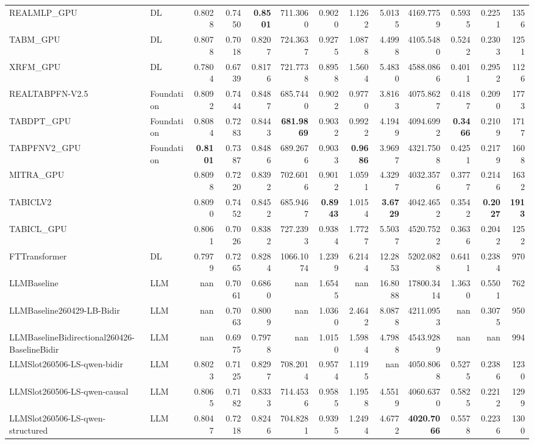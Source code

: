 \begin{table}[htbp]
{\begin{tabular}{ll|rrrrrrrrrr|r}
REALMLP\_GPU & DL & 0.8028 & 0.7450 & \textbf{0.8501} & 711.3060 & 0.9020 & 1.1262 & 5.0135 & 4169.7759 & 0.5935 & 0.2251 & 1356 \\
TABM\_GPU & DL & 0.8078 & 0.7018 & 0.8207 & 724.3637 & 0.9275 & 1.0878 & 4.4998 & 4105.5480 & 0.5242 & 0.2303 & 1251 \\
XRFM\_GPU & DL & 0.7804 & 0.6739 & 0.8176 & 721.7738 & 0.8958 & 1.5604 & 5.4830 & 4588.0866 & 0.4011 & 0.2952 & 1126 \\
REALTABPFN-V2.5 & Foundation & 0.8092 & 0.7444 & 0.8487 & 685.7440 & 0.9022 & 0.9770 & 3.8163 & 4075.8627 & 0.4187 & 0.2090 & 1773 \\
TABDPT\_GPU & Foundation & 0.8084 & 0.7283 & 0.8443 & \textbf{681.9869} & 0.9032 & 0.9922 & 4.1949 & 4094.6992 & \textbf{0.3466} & 0.2109 & 1717 \\
TABPFNV2\_GPU & Foundation & \textbf{0.8101} & 0.7387 & 0.8486 & 689.2676 & 0.9033 & \textbf{0.9686} & 3.9697 & 4321.7508 & 0.4251 & 0.2179 & 1608 \\
MITRA\_GPU &  & 0.8098 & 0.7220 & 0.8392 & 702.6016 & 0.9012 & 1.0591 & 4.3297 & 4032.3576 & 0.3777 & 0.2146 & 1632 \\
TABICLV2 &  & 0.8090 & 0.7452 & 0.8452 & 685.9467 & \textbf{0.8943} & 1.0154 & \textbf{3.6729} & 4042.4652 & 0.3542 & \textbf{0.2027} & \textbf{1913} \\
TABICL\_GPU &  & 0.8061 & 0.7026 & 0.8382 & 727.2393 & 0.9384 & 1.7727 & 5.5037 & 4520.7522 & 0.3636 & 0.2042 & 1252 \\
\midrule
FTTransformer & DL & 0.7979 & 0.7265 & 0.8284 & 1066.1074 & 1.2399 & 6.2144 & 12.2853 & 5202.0828 & 0.6411 & 0.2384 & 970 \\
LLMBaseline & LLM & nan & 0.7061 & 0.6860 & nan & 1.6545 & nan & 16.8088 & 17800.3414 & 1.3630 & 0.5501 & 762 \\
LLMBaseline260429-LB-Bidir & LLM & nan & 0.7063 & 0.8009 & nan & 1.0360 & 2.4642 & 8.0878 & 4211.0953 & nan & 0.3075 & 950 \\
LLMBaselineBidirectional260426-BaselineBidir & LLM & nan & 0.6975 & 0.7978 & nan & 1.0150 & 1.5984 & 4.7988 & 4543.9289 & nan & nan & 994 \\
LLMSlot260506-LS-qwen-bidir & LLM & 0.8023 & 0.7125 & 0.8297 & 708.2014 & 0.9574 & 1.1195 & nan & 4050.8068 & 0.5275 & 0.2386 & 1230 \\
LLMSlot260506-LS-qwen-causal & LLM & 0.8065 & 0.7182 & 0.8333 & 714.4536 & 0.9585 & 1.1958 & 4.5519 & 4060.6370 & 0.5825 & 0.2212 & 1299 \\
LLMSlot260506-LS-qwen-structured & LLM & 0.8047 & 0.7218 & 0.8246 & 704.8281 & 0.9395 & 1.2494 & 4.6772 & \textbf{4020.7066} & 0.5578 & 0.2236 & 1300 \\

\end{tabular}}
\end{table}

